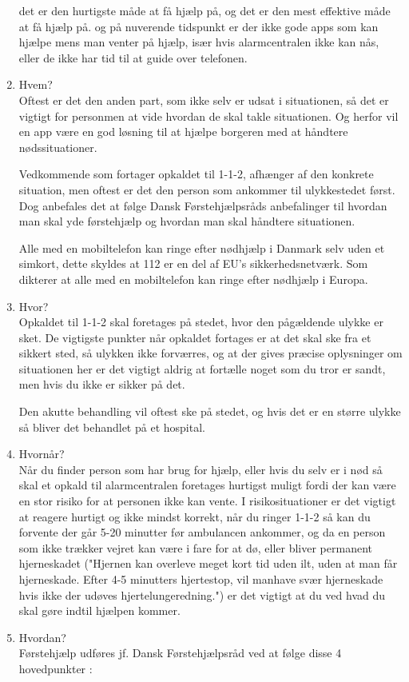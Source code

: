 \begin{enumerate}
    det er den hurtigste måde at få hjælp på, og det er den mest effektive måde at få hjælp på. og på nuverende tidspunkt er der ikke gode apps som kan hjælpe mens man venter på hjælp, især hvis alarmcentralen ikke kan nås, eller de ikke har tid til at guide over telefonen.
    
    \item Hvem? \\
    Oftest er det den anden part, som ikke selv er udsat i situationen, så det er vigtigt for personmen at vide hvordan de skal takle situationen. Og herfor vil en app være en god løsning til at hjælpe borgeren med at håndtere nødssituationer.

    Vedkommende som fortager opkaldet til 1-1-2, afhænger af den konkrete situation, men oftest er det den person som ankommer til ulykkestedet først. Dog anbefales det at følge Dansk Førstehjælpsråds anbefalinger til hvordan man skal yde førstehjælp og hvordan man skal håndtere situationen. 

    Alle med en mobiltelefon kan ringe efter nødhjælp i Danmark selv uden et simkort, dette skyldes at 112 er en del af EU's sikkerhedsnetværk. Som dikterer at alle med en mobiltelefon kan ringe efter nødhjælp i Europa. 


    \item Hvor? \\
    Opkaldet til 1-1-2 skal foretages på stedet, hvor den pågældende ulykke er sket. De vigtigste punkter når opkaldet fortages er at det skal ske fra et sikkert sted, så ulykken ikke forværres, og at der gives præcise oplysninger om situationen her er det vigtigt aldrig at fortælle noget som du tror er sandt, men hvis du ikke er sikker på det.

    Den akutte behandling vil oftest ske på stedet, og hvis det er en større ulykke så bliver det behandlet på et hospital.

    \item Hvornår? \\
    Når du finder person som har brug for hjælp, eller hvis du selv er i nød så skal et opkald til alarmcentralen foretages hurtigst muligt fordi der kan være en stor risiko for at personen ikke kan vente.
    I risikosituationer er det vigtigt at reagere hurtigt og ikke mindst korrekt, når du ringer 1-1-2 så kan du forvente der går 5-20 minutter før ambulancen ankommer, og da en person som ikke trækker vejret kan være i fare for at dø, eller bliver permanent hjerneskadet ("Hjernen kan overleve meget kort tid uden ilt, uden at man får hjerneskade. Efter 4-5 minutters hjertestop, vil manhave svær hjerneskade hvis ikke der udøves hjertelungeredning.") er det vigtigt at du ved hvad du skal gøre indtil hjælpen kommer. \\
    \vspace{1em}
    \item Hvordan? \\
    Førstehjælp udføres jf. Dansk Førstehjælpsråd ved at følge disse 4 hovedpunkter :


\end{enumerate}
